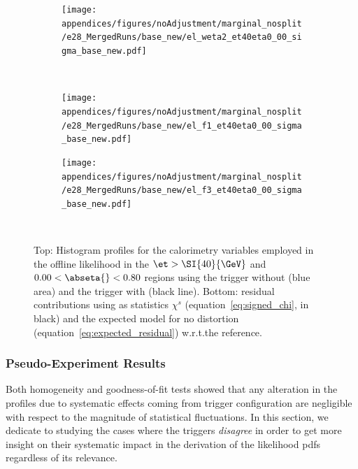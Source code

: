 \begin{figure}[t]\ContinuedFloat
\begin{center}
\hspace*{\fill}
\begin{subfigure}[c]{.48\textwidth}
\centering
\texttt{[image: appendices/figures/noAdjustment/marginal\_nosplit/e28\_MergedRuns/base\_new/el\_weta2\_et40eta0\_00\_sigma\_base\_new.pdf]}
\caption{}%
\label{fig:gof_weta}
\end{subfigure}
\hspace*{\fill} \\
\begin{subfigure}[c]{.48\textwidth}
\centering
\texttt{[image: appendices/figures/noAdjustment/marginal\_nosplit/e28\_MergedRuns/base\_new/el\_f1\_et40eta0\_00\_sigma\_base\_new.pdf]}
\caption{}%
\label{fig:gof_f1}
\end{subfigure}
\hfill
\begin{subfigure}[c]{.48\textwidth}
\centering
\texttt{[image: appendices/figures/noAdjustment/marginal\_nosplit/e28\_MergedRuns/base\_new/el\_f3\_et40eta0\_00\_sigma\_base\_new.pdf]}
\caption{}%
\label{fig:gof_f3}
\end{subfigure} \\
\caption{%
Top: Histogram profiles for the calorimetry variables employed in the offline
likelihood in the $\et>\SI{40}{\GeV}$ and $0.00<\abseta{}<0.80$ regions using
the trigger without \rnn{} (blue area) and the trigger with \rnn{} (black line).
Bottom: residual contributions using as statistics $\chi^s$
(equation~\ref{eq:signed_chi}, in black) and the expected model for no
distortion (equation~\ref{eq:expected_residual}) w.r.t.\@ the reference.
}%
\label{fig:gof_calo}
\end{center}
\end{figure}

\FloatBarrier
\subsubsection{Pseudo-Experiment Results}\label{top:agreement_pseudo_results}

Both homogeneity and goodness-of-fit tests showed that any alteration in the
profiles due to systematic effects coming from trigger configuration are
negligible with respect to the magnitude of statistical fluctuations. In this
section, we dedicate to studying the cases where the triggers \emph{disagree} in
order to get more insight on their systematic impact in the derivation of the
likelihood pdfs regardless of its relevance.

